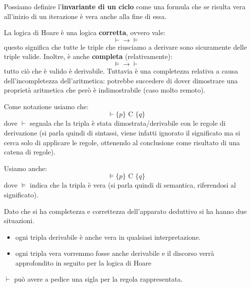 \begin{definizione}
    Possiamo definire l'\textbf{invariante di un ciclo} come una formula che se
    risulta vera all'inizio di un iterazione è vera anche alla fine di essa.
\end{definizione}

La logica di Hoare è una logica \textbf{corretta}, ovvero vale:
\begin{equation}
    \vdash \to \models
\end{equation}
questo significa che tutte le triple che riusciamo a derivare sono sicuramente
delle triple valide. Inoltre, è anche \textbf{completa} (relativamente):
\begin{equation}
    \models \to \vdash
\end{equation}
tutto ciò che è valido è derivabile. Tuttavia è una completezza relativa a causa
dell'incompletezza dell'aritmetica: potrebbe succedere di dover dimostrare una
proprietà aritmetica che però è indimostrabile (caso molto remoto).

Come notazione usiamo che:
\begin{equation}
    \vdash \{p\} \text{ C } \{q\}
\end{equation}
dove $\vdash$ segnala che la tripla è stata dimostrata/derivabile con le regole
di derivazione (si parla quindi di sintassi, viene infatti ignorato il
significato ma si cerca solo di applicare le regole, ottenendo al conclusione
come risultato di una catena di regole).

Usiamo anche:
\begin{equation}
    \models \{p\} \text{ C } \{q\}
\end{equation}
dove $\models$ indica che la tripla è vera (si parla quindi di semantica, riferendosi
al significato).

Dato che si ha completezza e correttezza dell’apparato deduttivo si ha hanno due
situazioni.
\begin{itemize}
    \item ogni tripla derivabile è anche vera in qualsiasi interpretazione.
    \item ogni tripla vera vorremmo fosse anche derivabile e il discorso verrà
          approfondito in seguito per la logica di Hoare
\end{itemize}
$\vdash$ può avere a pedice una sigla per la regola rappresentata.
